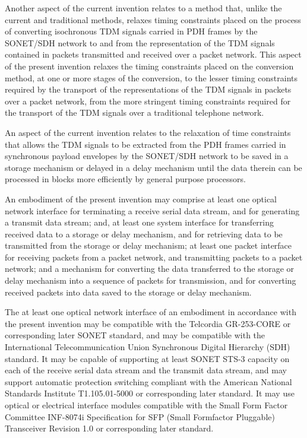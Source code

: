 \documentclass[letterpaper,final,notitlepage,twocolumn,10pt,twoside]{article}
\begin{document}
Another aspect of the current invention relates to a method that, unlike the
current and traditional methods, relaxes timing constraints placed on the
process of converting isochronous TDM signals carried in PDH frames by the
SONET/SDH network to and from the representation of the TDM signals contained
in packets transmitted and received over a packet network.  This aspect of the
present invention relaxes the timing constraints placed on the conversion
method, at one or more stages of the conversion, to the lesser timing
constraints required by the transport of the representations of the TDM
signals in packets over a packet network, from the more stringent timing
constraints required for the transport of the TDM signals over a traditional
telephone network.

An aspect of the current invention relates to the relaxation of time
constraints that allows the TDM signals to be extracted from the PDH frames
carried in synchronous payload envelopes by the SONET/SDH network to be saved
in a storage mechanism or delayed in a delay mechanism until the data therein
can be processed in blocks more efficiently by general purpose processors.

An embodiment of the present invention may comprise at least one optical
network interface for terminating a receive serial data stream, and for
generating a transmit data stream; and, at least one system interface for
transferring received data to a storage or delay mechanism, and for retrieving
data to be transmitted from the storage or delay mechanism; at least one
packet interface for receiving packets from a packet network, and transmitting
packets to a packet network; and a mechanism for converting the data
transferred to the storage or delay mechanism into a sequence of packets for
transmission, and for converting received packets into data saved to the
storage or delay mechanism.

The at least one optical network interface of an embodiment in accordance with
the present invention may be compatible with the Telcordia GR-253-CORE
\nocite{gr253core} or corresponding later SONET standard, and may be
compatible with the International Telecommunication Union Synchronous Digital
Hierarchy (SDH) standard.  It may be capable of supporting at least SONET
STS-3 capacity on each of the receive serial data stream and the transmit data
stream, and may support automatic protection switching compliant with the
American National Standards Institute T1.105.01-5000 or corresponding later
standard.  It may use optical or electrical interface modules compatible with
the Small Form Factor Committee INF-8074i Specification for SFP (Small
Formfactor Pluggable) Transceiver Revision 1.0 or corresponding later
standard. \nocite{inf8074}
\end{document}
